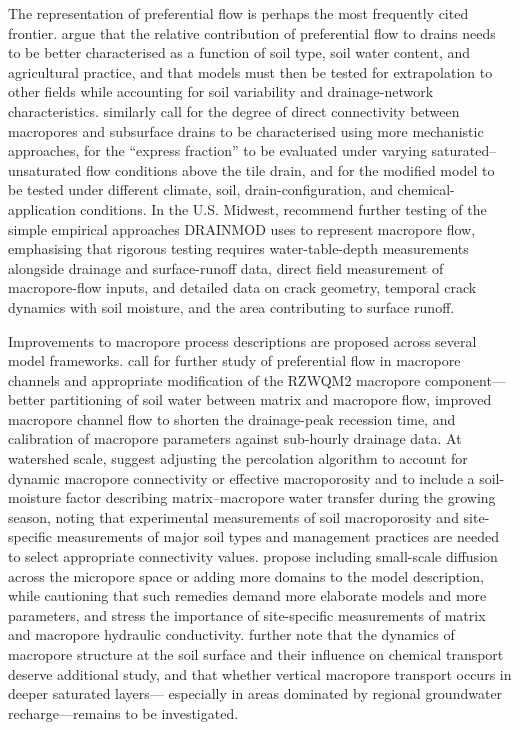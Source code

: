 \documentclass[11pt]{article}
\begin{document}
The representation of preferential flow is perhaps the most frequently cited
frontier. \textcite{Gaillot2023} argue that the relative contribution of
preferential flow to drains needs to be better characterised as a function of
soil type, soil water content, and agricultural practice, and that models must
then be tested for extrapolation to other fields while accounting for soil
variability and drainage-network characteristics. \textcite{Fox2004}
similarly call for the degree of direct connectivity between macropores and
subsurface drains to be characterised using more mechanistic approaches, for
the ``express fraction'' to be evaluated under varying saturated--unsaturated
flow conditions above the tile drain, and for the modified model to be tested
under different climate, soil, drain-configuration, and chemical-application
conditions. In the U.S. Midwest, \textcite{Askar2020} recommend further
testing of the simple empirical approaches DRAINMOD uses to represent
macropore flow, emphasising that rigorous testing requires water-table-depth
measurements alongside drainage and surface-runoff data, direct field
measurement of macropore-flow inputs, and detailed data on crack geometry,
temporal crack dynamics with soil moisture, and the area contributing to
surface runoff.

Improvements to macropore process descriptions are proposed across several
model frameworks. \textcite{Li2023d} call for further study of preferential
flow in macropore channels and appropriate modification of the RZWQM2
macropore component---better partitioning of soil water between matrix and
macropore flow, improved macropore channel flow to shorten the drainage-peak
recession time, and calibration of macropore parameters against sub-hourly
drainage data. At watershed scale, \textcite{Poon2021} suggest adjusting the
percolation algorithm to account for dynamic macropore connectivity or
effective macroporosity and to include a soil-moisture factor describing
matrix--macropore water transfer during the growing season, noting that
experimental measurements of soil macroporosity and site-specific measurements
of major soil types and management practices are needed to select appropriate
connectivity values. \textcite{Villholth1998b} propose including small-scale
diffusion across the micropore space or adding more domains to the model
description, while cautioning that such remedies demand more elaborate models
and more parameters, and stress the importance of site-specific measurements
of matrix and macropore hydraulic conductivity. \textcite{Villholth1998}
further note that the dynamics of macropore structure at the soil surface and
their influence on chemical transport deserve additional study, and that
whether vertical macropore transport occurs in deeper saturated layers---
especially in areas dominated by regional groundwater recharge---remains to be
investigated.
\end{document}
